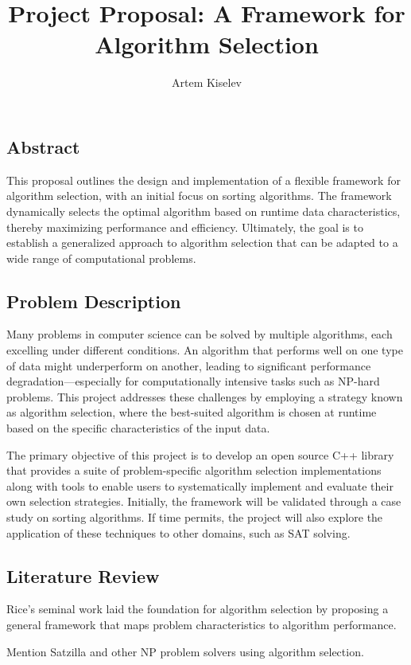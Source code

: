 \documentclass[twocolumn]{article}
\title{Project Proposal: A Framework for Algorithm Selection}
\author{Artem Kiselev}
\begin{document}
\maketitle

\subsection*{Abstract}
This proposal outlines the design and implementation of a flexible framework for algorithm selection, with an initial focus on sorting algorithms. The framework dynamically selects the optimal algorithm based on runtime data characteristics, thereby maximizing performance and efficiency. Ultimately, the goal is to establish a generalized approach to algorithm selection that can be adapted to a wide range of computational problems.

\subsection*{Problem Description}
Many problems in computer science can be solved by multiple algorithms, each excelling under different conditions. An algorithm that performs well on one type of data might underperform on another, leading to significant performance degradation—especially for computationally intensive tasks such as NP-hard problems. This project addresses these challenges by employing a strategy known as algorithm selection, where the best-suited algorithm is chosen at runtime based on the specific characteristics of the input data.

The primary objective of this project is to develop an open source C++ library that provides a suite of problem-specific algorithm selection implementations along with tools to enable users to systematically implement and evaluate their own selection strategies. Initially, the framework will be validated through a case study on sorting algorithms. If time permits, the project will also explore the application of these techniques to other domains, such as SAT solving.

\subsection*{Literature Review}
Rice's seminal work \cite{rice1976algorithm} laid the foundation for algorithm selection by proposing a general framework that maps problem characteristics to algorithm performance. 

Mention Satzilla and other NP problem solvers using algorithm selection.
\end{document}
